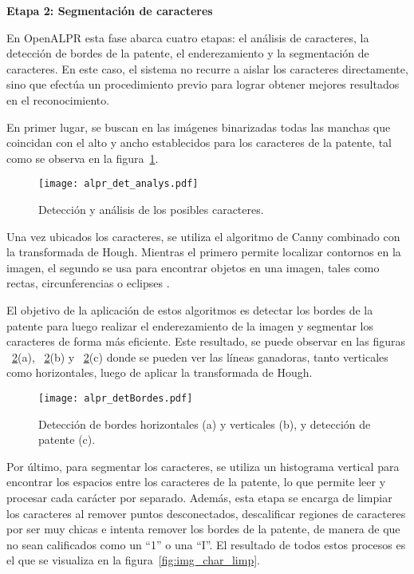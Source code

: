 \quad

\noindent \textbf{Etapa 2: Segmentación de caracteres}

 En OpenALPR esta fase abarca cuatro etapas: el análisis de caracteres, la detección de bordes de la patente, el enderezamiento y la segmentación de caracteres. En este caso, el sistema no recurre a aislar los caracteres directamente, sino que efectúa un procedimiento previo para lograr obtener mejores resultados en el reconocimiento.

En primer lugar, se buscan en las imágenes binarizadas todas las manchas que coincidan con el alto y ancho establecidos para los caracteres de la patente, tal como se observa en la figura~\ref{fig:img_det_analys}.

\begin{figure}[H]
	\centering
	\texttt{[image: alpr\_det\_analys.pdf]}
	\caption{Detección y análisis de los posibles caracteres.}
	\label{fig:img_det_analys}
\end{figure}

Una vez ubicados los caracteres, se utiliza el algoritmo de Canny combinado con la transformada de Hough. Mientras el primero permite localizar contornos en la imagen, el segundo se usa para encontrar objetos en una imagen, tales como rectas, circunferencias o eclipses \cite{navacerrada}.

El objetivo de la aplicación de estos algoritmos es detectar los bordes de la patente para luego realizar el enderezamiento de la imagen y segmentar los caracteres de forma más eficiente. Este resultado, se puede observar en las figuras ~\ref{fig:img_det_bordes}(a), ~\ref{fig:img_det_bordes}(b) y ~\ref{fig:img_det_bordes}(c) donde se pueden ver las líneas ganadoras, tanto verticales como horizontales, luego de aplicar la transformada de Hough.

\begin{figure}[H]
	\centering
	\texttt{[image: alpr\_detBordes.pdf]}
	\caption{Detección de bordes horizontales (a) y verticales (b), y detección de patente (c).}
	\label{fig:img_det_bordes}
\end{figure}

Por último, para segmentar los caracteres, se utiliza un histograma vertical para encontrar los espacios entre los caracteres de la patente, lo que permite leer y procesar cada carácter por separado. Además, esta etapa se encarga de limpiar los caracteres al remover puntos desconectados, descalificar regiones de caracteres por ser muy chicas e intenta remover los bordes de la patente, de manera de que no sean calificados como un “1” o una “I”. El resultado de todos estos procesos es el que se visualiza en la figura~\ref{fig:img_char_limp}.

